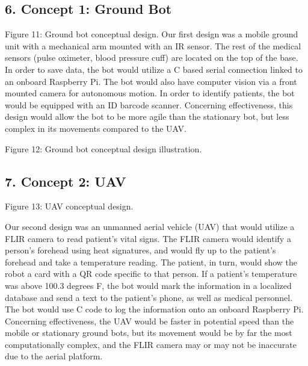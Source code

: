 ﻿\documentclass[10pt]{article}
\begin{document}
\subsection{6. Concept 1:  Ground Bot}
%	
%
%	
%
Figure 11: Ground bot conceptual design.
Our first design was a mobile ground unit with a mechanical arm mounted with an IR sensor. The rest of the medical sensors (pulse oximeter, blood pressure cuff) are located on the top of the base. In order to save data, the bot would utilize a C based serial connection linked to an onboard Raspberry Pi. The bot would also have computer vision via a front mounted camera for autonomous motion. In order to identify patients, the bot would be equipped with an ID barcode scanner. Concerning effectiveness, this design would allow the bot to be more agile than the stationary bot, but less complex in its movements compared to the UAV. 

Figure 12: Ground bot conceptual design illustration.

\subsection{7. Concept 2:  UAV}
%	
%
Figure 13: UAV conceptual design.

Our second design was an unmanned aerial vehicle (UAV) that would utilize a FLIR camera to read patient’s vital signs. The FLIR camera would identify a person’s forehead using heat signatures, and would fly up to the patient’s forehead and take a temperature reading. The patient, in turn, would show the robot a card with a QR code specific to that person. If a patient’s temperature was above 100.3 degrees F, the bot would mark the information in a localized database and send a text to the patient’s phone, as well as medical personnel. The bot would use C code to log the information onto an onboard Raspberry Pi. Concerning effectiveness, the UAV would be faster in potential speed than the mobile or stationary ground bots, but its movement would be by far the most computationally complex, and the FLIR camera may or may not be inaccurate due to the aerial platform.
\end{document}
